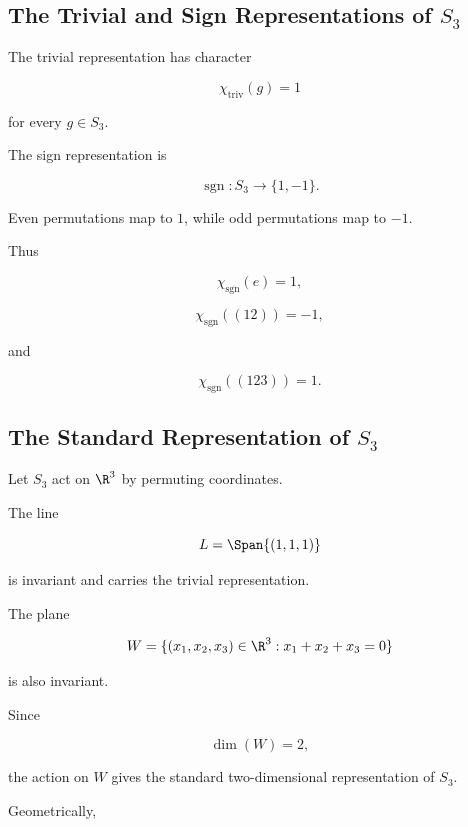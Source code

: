 \subsection{The Trivial and Sign Representations of \(S_3\)}
\label{subsec:s3-trivial-sign}

The trivial representation has character

\[ \chi_{\mathrm{triv}}(g)=1 \]

for every \(g\in S_3\).

The sign representation is

\[ \operatorname{sgn}:S_3\to\{1,-1\}. \]

Even permutations map to \(1\), while odd permutations map to \(-1\).

Thus

\[ \chi_{\mathrm{sgn}}(e)=1, \]

\[ \chi_{\mathrm{sgn}}((12))=-1, \]

and

\[ \chi_{\mathrm{sgn}}((123))=1. \]

\subsection{The Standard Representation of \(S_3\)}
\label{subsec:s3-standard-representation}

Let \(S_3\) act on \(\R^3\) by permuting coordinates.

The line

\[ L=\Span\{(1,1,1)\} \]

is invariant and carries the trivial representation.

The plane

\[ W=\{(x_1,x_2,x_3)\in\R^3:x_1+x_2+x_3=0\} \]

is also invariant.

Since

\[ \dim(W)=2, \]

the action on \(W\) gives the standard two-dimensional representation of
\(S_3\).

Geometrically,

\begin{center}
\end{center}

